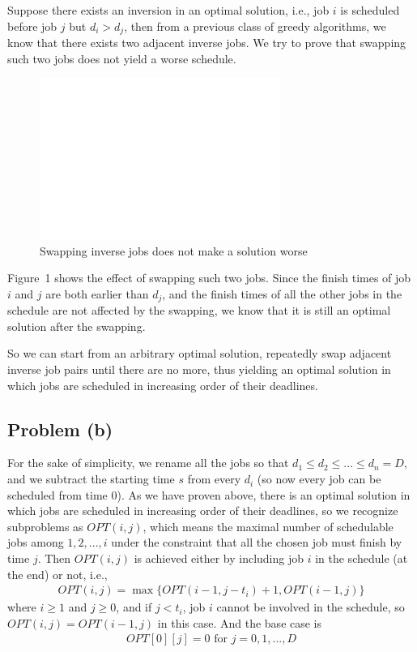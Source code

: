 \documentclass[12pt,letterpaper]{article}
\begin{document}
Suppose there exists an inversion in an optimal solution, i.e., job $i$ is scheduled before job $j$ but $d_i > d_j$, then from a previous class of greedy algorithms, we know that there exists two adjacent inverse jobs. We try to prove that swapping such two jobs does not yield a worse schedule.
\begin{figure}
\begin{center}
\includegraphics[width=0.7\textwidth]{4.28.eps}
\caption{Swapping inverse jobs does not make a solution worse}
\end{center}
\end{figure}
Figure~1 shows the effect of swapping such two jobs. Since the finish times of job $i$ and $j$ are both earlier than $d_j$, and the finish times of all the other jobs in the schedule are not affected by the swapping, we know that it is still an optimal solution after the swapping.

So we can start from an arbitrary optimal solution, repeatedly swap adjacent inverse job pairs until there are no more, thus yielding an optimal solution in which jobs are scheduled in increasing order of their deadlines.

\subsection*{Problem (b)}
For the sake of simplicity, we rename all the jobs so that $d_1\le d_2\le...\le d_n=D$, and we subtract the starting time $s$ from every $d_i$ (so now every job can be scheduled from time 0). As we have proven above, there is an optimal solution in which jobs are scheduled in increasing order of their deadlines, so we recognize subproblems as $OPT(i,j)$, which means the maximal number of schedulable jobs among $1, 2, ..., i$ under the constraint that all the chosen job must finish by time $j$. Then $OPT(i,j)$ is achieved either by including job $i$ in the schedule (at the end) or not, i.e.,
\begin{align}
OPT(i,j) = \max{\{OPT(i-1,j-t_i)+1, OPT(i-1,j)\}}
\end{align}
where $i\ge 1$ and $j\ge 0$, and if $j < t_i$, job $i$ cannot be involved in the schedule, so $OPT(i,j) = OPT(i-1,j)$ in this case. And the base case is
\begin{align}
OPT[0][j] = 0 \textrm{ for } j=0, 1, ..., D
\end{align}
\end{document}
